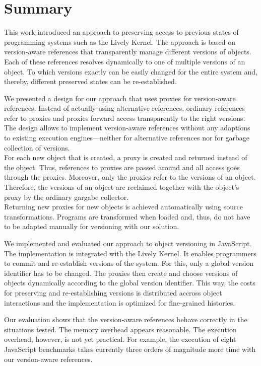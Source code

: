 \chapter{Summary} \label{chapter:SUMMARY}

This work introduced an approach to preserving access to previous states of programming systems such as the Lively Kernel.
The approach is based on version-aware references that transparently manage different versions of objects.
Each of these references resolves dynamically to one of multiple versions of an object.
To which versions exactly can be easily changed for the entire system and, thereby, different preserved states can be re-established.

We presented a design for our approach that uses proxies for version-aware references.
Instead of actually using alternative references, ordinary references refer to proxies and proxies forward access transparently to the right versions.
The design allows to implement version-aware references without any adaptions to existing execution engines---neither for alternative references nor for garbage collection of versions.\\
For each new object that is created, a proxy is created and returned instead of the object.
Thus, references to proxies are passed around and all access goes through the proxies.
Moreover, only the proxies refer to the versions of an object.
Therefore, the versions of an object are reclaimed together with the object's proxy by the ordinary gargabe collector.\\
Returning new proxies for new objects is achieved automatically using source transformations.
Programs are transformed when loaded and, thus, do not have to be adapted manually for versioning with our solution.

We implemented and evaluated our approach to object versioning in JavaScript.
The implementation is integrated with the Lively Kernel.
It enables programmers to commit and re-establish versions of the system.
For this, only a global version identifier has to be changed.
The proxies then create and choose versions of objects dynamically according to the global version identifier.
This way, the costs for preserving and re-establishing versions is distributed accross object interactions and the implementation is optimized for fine-grained histories.

Our evaluation shows that the version-aware references behave correctly in the situations tested.
The memory overhead appears reasonable.
The execution overhead, however, is not yet practical.
For example, the execution of eight JavaScript benchmarks takes currently three orders of magnitude more time with our version-aware references.

